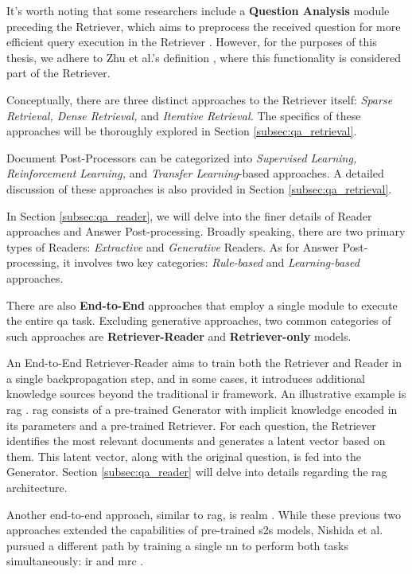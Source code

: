It's worth noting that some researchers include a \textbf{Question Analysis} module preceding the Retriever, which aims to preprocess the received question for more efficient query execution in the Retriever \cite{nassiri_transformer_2023}. However, for the purposes of this thesis, we adhere to Zhu et al.'s definition \cite{zhu_retrieving_2021}, where this functionality is considered part of the Retriever.

Conceptually, there are three distinct approaches to the Retriever itself: \textit{Sparse Retrieval, Dense Retrieval,} and \textit{Iterative Retrieval.} The specifics of these approaches will be thoroughly explored in Section \ref{subsec:qa_retrieval}.

Document Post-Processors can be categorized into \textit{Supervised Learning, Reinforcement Learning,} and \textit{Transfer Learning}-based approaches. A detailed discussion of these approaches is also provided in Section \ref{subsec:qa_retrieval}.

In Section \ref{subsec:qa_reader}, we will delve into the finer details of Reader approaches and Answer Post-processing. Broadly speaking, there are two primary types of Readers: \textit{Extractive} and \textit{Generative} Readers. As for Answer Post-processing, it involves two key categories: \textit{Rule-based} and \textit{Learning-based} approaches.

There are also \textbf{End-to-End} approaches that employ a single module to execute the entire \gls{qa} task. Excluding generative approaches, two common categories of such approaches are \textbf{Retriever-Reader} and \textbf{Retriever-only} models.

An End-to-End Retriever-Reader aims to train both the Retriever and Reader in a single backpropagation step, and in some cases, it introduces additional knowledge sources beyond the traditional \gls{ir} framework. An illustrative example is \gls{rag} \cite{lewis_retrieval-augmented_2021}. \gls{rag} consists of a pre-trained Generator with implicit knowledge encoded in its parameters and a pre-trained Retriever. For each question, the Retriever identifies the most relevant documents and generates a latent vector based on them. This latent vector, along with the original question, is fed into the Generator. Section \ref{subsec:qa_reader} will delve into details regarding the \gls{rag} architecture.

Another end-to-end approach, similar to \gls{rag}, is \gls{realm} \cite{guu_realm_2020}. While these previous two approaches extended the capabilities of pre-trained \gls{s2s} models, Nishida et al. pursued a different path by training a single \gls{nn} to perform both tasks simultaneously: \gls{ir} and \gls{mrc} \cite{nishida_retrieve-and-read_2018}.

